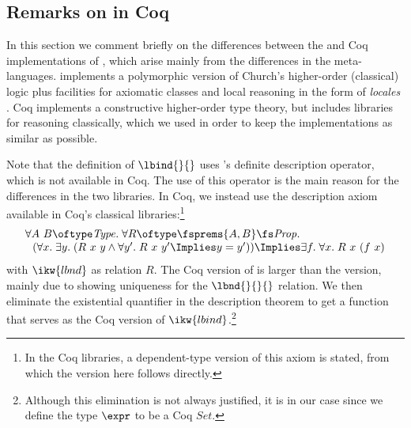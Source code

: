 \documentclass[final]{svjour3}
\begin{document}
\subsection{Remarks on \hybrid in Coq}
\label{ssec:hcoq}


In this section we comment briefly on the differences between the \HOL
and Coq implementations of \hybrid, which arise mainly from the
differences in the meta-languages.  \HOL implements a
polymorphic version of Church's higher-order (classical) logic plus
facilities for axiomatic classes and local reasoning in the form of
\emph{locales} \cite{Ballarin03}.  Coq
implements a constructive higher-order type theory,
but includes
libraries for reasoning classically, which we used in order to keep
the implementations as similar as possible.

Note that the definition of $\lbind{}{}$ uses \HOL's definite
description operator, which is not available in Coq.  The use of this
operator is the main reason for the differences in the two libraries.
In Coq, we instead use the description axiom available in Coq's
classical libraries:\footnote{In the Coq libraries, a dependent-type
version of this axiom is stated, from which the  version  here
follows directly.}
$$\begin{array}{l}
\forall A\ B \oftype \mathit{Type}.\;
\forall R \oftype \fsprems{A,B} \fs \mathit{Prop}.\; \\
~~(\forall x.\; \exists y.\;
  (R~x~y \land \forall y'.\; R~x~y' \Implies y=y')) \Implies
\exists f.\; \forall x.\;R~x~(f~x)
\end{array}$$
with $\ikw{lbnd}$ as relation $R$.
The Coq version of \hybrid is larger than the \HOL version,
mainly due to showing uniqueness for the $\lbnd{}{}{}$ relation.
We then eliminate the
existential quantifier in the description theorem to get a function
that serves as the Coq version of $\ikw{lbind}$.\footnote{Although this
elimination is not always justified, it is in our case since we define
the type $\expr$ to be a Coq ${Set}$.}

\newcommand{\Prop}{\textit{Prop}\xspace}
\newcommand{\Set}{\textit{Set}\xspace}
\end{document}
